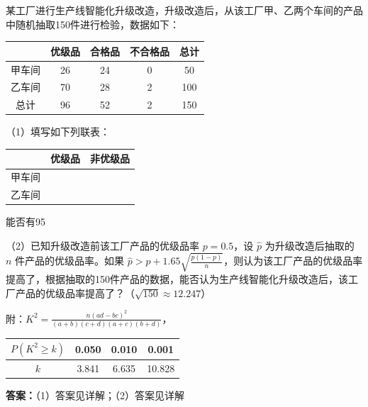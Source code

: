 \begin{question}[points=12]
某工厂进行生产线智能化升级改造，升级改造后，从该工厂甲、乙两个车间的产品中随机抽取150件进行检验，数据如下：

\begin{tabular}{c|ccc|c}

& 优级品 & 合格品 & 不合格品 & 总计 \\

\hline

甲车间 & 26 & 24 & 0 & 50 \\

乙车间 & 70 & 28 & 2 & 100 \\

\hline

总计 & 96 & 52 & 2 & 150 \\

\end{tabular}

（1）填写如下列联表：

\begin{tabular}{c|c|c}

& 优级品 & 非优级品 \\

\hline

甲车间 & & \\

乙车间 & & \\

\end{tabular}

能否有95%

（2）已知升级改造前该工厂产品的优级品率 $p=0.5$，设 $\hat{p}$ 为升级改造后抽取的 $n$ 件产品的优级品率。如果 $\hat{p}>p+1.65\sqrt{\frac{p(1-p)}{n}}$，则认为该工厂产品的优级品率提高了，根据抽取的150件产品的数据，能否认为生产线智能化升级改造后，该工厂产品的优级品率提高了？（$\sqrt{150}\approx12.247$）

附：$K^2=\frac{n(ad-bc)^2}{(a+b)(c+d)(a+c)(b+d)}$，

\begin{tabular}{c|ccc}

$P(K^2\ge k)$ & 0.050 & 0.010 & 0.001 \\

\hline

$k$ & 3.841 & 6.635 & 10.828 \\

\end{tabular}
\begin{solution}
\textbf{答案：}（1）答案见详解；（2）答案见详解


\end{solution}
\end{question}
